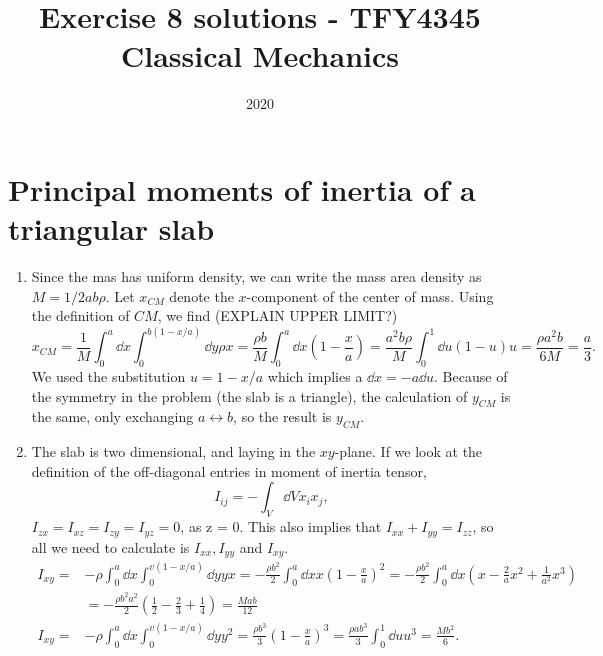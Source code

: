 \documentclass{article}
\title{Exercise 8 solutions - TFY4345 Classical Mechanics}
\date{2020}
\begin{document}
    \maketitle
    \section{Principal moments of inertia of a triangular slab}
    \begin{enumerate}[label=(\alph*)]
        \item Since the mas has uniform density, we can write the mass area density as $M =   1/2 ab\rho$. Let $x_{CM}$ denote the $x$-component of the center of mass. Using the definition of $CM$, we find (EXPLAIN UPPER LIMIT?)
        \begin{equation*}
            x_{CM} = \frac{1}{M} \int_0^a \dd x \int_0^{b(1 - x / a)} \dd y \rho x = \frac{\rho b}{M} \int_0^a \dd x \left( 1 - \frac{x}{a}\right) = \frac{a^2 b \rho}{M} \int_0^1 \dd u (1 - u)u = \frac{\rho a^2 b}{6M} = \frac{a}{3}. 
        \end{equation*}
        We used the substitution $u = 1 - x/a$ which implies a $ \dd x = - a \dd u $. Because of the symmetry in the problem (the slab is a triangle), the calculation of $y_{CM}$ is the same, only exchanging $ a \leftrightarrow b $, so the result is $y_{CM}$.
        \item The slab is two dimensional, and laying in the $xy$-plane. If we look at the definition of the off-diagonal entries in moment of inertia tensor,
        \begin{equation*}
            I_{ij} = - \int_V \dd V x_ix_j,
        \end{equation*} $I_{zx} = I_{xz} = I_{zy} = I_{yz} = 0$, as  z = 0. This also implies that $I_{xx} + I_{yy} = I_{zz}$, so all we need to calculate is $I_{xx}, I_{yy}$ and $I_{xy}$.
        \begin{align*}
            I_{xy} =& -\rho \int_0^a \dd x \int_0^{v(1 - x/a)} \dd y yx = - \frac{\rho b^2}{2}\int_0^a \dd x x \left( 1 - \frac{x}{a} \right)^2 = - \frac{\rho b^2}{2} \int_0^a \dd x \left( x - \frac{2}{a}x^2 + \frac{1}{a^2} x^3\right) \\
            &= -\frac{\rho b^2 a^2}{2}\left( \frac{1}{2} - \frac{2}{3} + \frac{1}{4} \right) = \frac{M a b}{12} \\
            I_{xy} = & -\rho \int_0^a \dd x \int_0^{v(1 - x/a)} \dd y y^2 = \frac{\rho b^3}{3}
            \left(1 - \frac{x}{a}\right)^3 = \frac{\rho a b^3}{3} \int_0^1 \dd u u^3 = \frac{M b^2}{6}.

\end{align*}
\end{enumerate}
\end{document}
